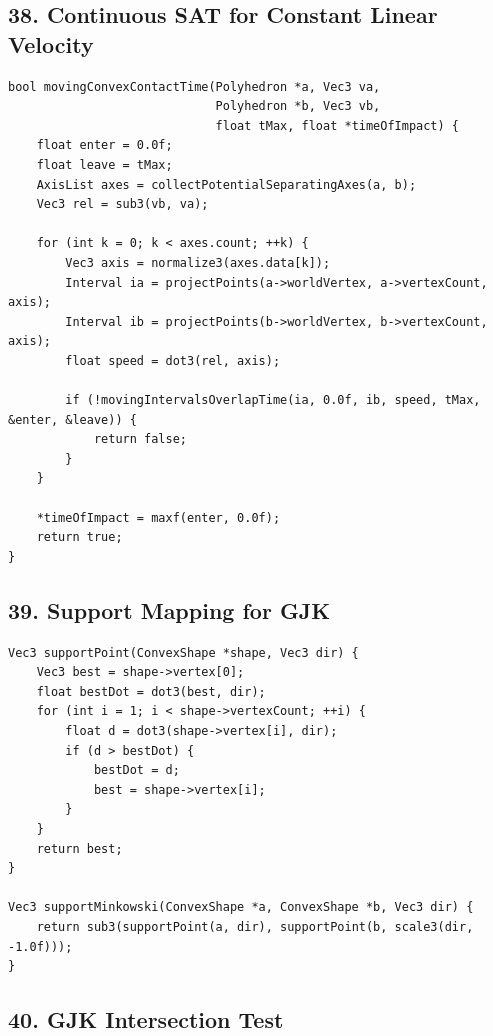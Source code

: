 \documentclass[10pt,letterpaper]{article}
\begin{document}
\subsection*{38. Continuous SAT for Constant Linear Velocity}

\begin{verbatim}
bool movingConvexContactTime(Polyhedron *a, Vec3 va,
                             Polyhedron *b, Vec3 vb,
                             float tMax, float *timeOfImpact) {
    float enter = 0.0f;
    float leave = tMax;
    AxisList axes = collectPotentialSeparatingAxes(a, b);
    Vec3 rel = sub3(vb, va);

    for (int k = 0; k < axes.count; ++k) {
        Vec3 axis = normalize3(axes.data[k]);
        Interval ia = projectPoints(a->worldVertex, a->vertexCount, axis);
        Interval ib = projectPoints(b->worldVertex, b->vertexCount, axis);
        float speed = dot3(rel, axis);

        if (!movingIntervalsOverlapTime(ia, 0.0f, ib, speed, tMax, &enter, &leave)) {
            return false;
        }
    }

    *timeOfImpact = maxf(enter, 0.0f);
    return true;
}
\end{verbatim}

\subsection*{39. Support Mapping for GJK}

\begin{verbatim}
Vec3 supportPoint(ConvexShape *shape, Vec3 dir) {
    Vec3 best = shape->vertex[0];
    float bestDot = dot3(best, dir);
    for (int i = 1; i < shape->vertexCount; ++i) {
        float d = dot3(shape->vertex[i], dir);
        if (d > bestDot) {
            bestDot = d;
            best = shape->vertex[i];
        }
    }
    return best;
}

Vec3 supportMinkowski(ConvexShape *a, ConvexShape *b, Vec3 dir) {
    return sub3(supportPoint(a, dir), supportPoint(b, scale3(dir, -1.0f)));
}
\end{verbatim}

\subsection*{40. GJK Intersection Test}
\end{document}
